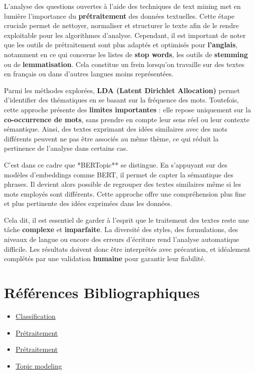 \documentclass[
]{article}
\begin{document}
L'analyse des questions ouvertes à l'aide des techniques de text mining
met en lumière l'importance du \textbf{prétraitement} des données
textuelles. Cette étape cruciale permet de nettoyer, normaliser et
structurer le texte afin de le rendre exploitable pour les algorithmes
d'analyse. Cependant, il est important de noter que les outils de
prétraitement sont plus adaptés et optimisés pour \textbf{l'anglais},
notamment en ce qui concerne les listes de \textbf{stop words}, les
outils de \textbf{stemming} ou de \textbf{lemmatisation}. Cela constitue
un frein lorsqu'on travaille sur des textes en français ou dans d'autres
langues moins représentées.

Parmi les méthodes explorées, \textbf{LDA (Latent Dirichlet Allocation)}
permet d'identifier des thématiques en se basant sur la fréquence des
mots. Toutefois, cette approche présente des \textbf{limites
importantes} : elle repose uniquement sur la \textbf{co-occurrence de
mots}, sans prendre en compte leur sens réel ou leur contexte
sémantique. Ainsi, des textes exprimant des idées similaires avec des
mots différents peuvent ne pas être associés au même thème, ce qui
réduit la pertinence de l'analyse dans certains cas.

C'est dans ce cadre que *BERTopic** se distingue. En s'appuyant sur des
modèles d'embeddings comme BERT, il permet de capter la sémantique des
phrases. Il devient alors possible de regrouper des textes similaires
même si les mots employés sont différents. Cette approche offre une
compréhension plus fine et plus pertinente des idées exprimées dans les
données.

Cela dit, il est essentiel de garder à l'esprit que le traitement des
textes reste une tâche \textbf{complexe} et \textbf{imparfaite}. La
diversité des styles, des formulations, des niveaux de langue ou encore
des erreurs d'écriture rend l'analyse automatique difficile. Les
résultats doivent donc être interprétés avec précaution, et idéalement
complétés par une validation \textbf{humaine} pour garantir leur
fiabilité.

\section{Références
Bibliographiques}\label{ruxe9fuxe9rences-bibliographiques}

\begin{itemize}
\item
  \href{https://www.innovatiana.com/post/best-datasets-for-text-classification}{Classification}
\item
  \href{https://guides.library.upenn.edu/penntdm/r}{Prétraitement}
\item
  \href{https://bookdown.org/tianyuan09/ai4ph2022/tutorial.html}{Prétraitement}
\item
  \href{https://ladal.edu.au/tutorials/topic/topic.html?}{Topic
  modeling}
\end{itemize}
\end{document}
